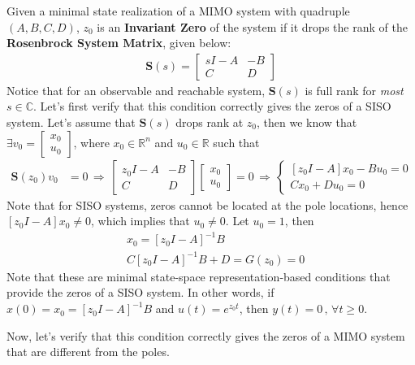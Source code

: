 \documentclass[twoside]{article}
\begin{document}
Given a minimal state realization of a MIMO system with quadruple $(A,B,C,D)$, $z_0$ is an \textbf{Invariant Zero} of the system if it drops the rank of the \textbf{Rosenbrock System Matrix}, given below:
%
\begin{align*}
\mathbf{S}(s) = \left[ \begin{array}{c|c} s I - A & -B \\ \hline C & D \end{array} \right]
\end{align*}
%
Notice that for an observable and reachable system, $\mathbf{S}(s)$ is full rank for \textit{most} $s \in \mathbb{C}$. 
Let's first verify that this condition correctly gives the zeros of a SISO system. Let's assume that 
$\mathbf{S}(s)$ drops rank at $z_0$, then we know that $\exists v_0 = \begin{bmatrix} x_0 \\ u_0 \end{bmatrix}$, where $x_0 \in \mathbb{R}^{n}$
and $u_0 \in \mathbb{R}$ such that 
%
\begin{align*}
\mathbf{S}(z_0) v_0 &= 0
\, \Rightarrow \,
\left[ \begin{array}{c|c} z_0 I - A & -B \\ \hline C & D \end{array} \right] \begin{bmatrix} x_0 \\ u_0 \end{bmatrix} = 0
\, \Rightarrow \,
 \begin{cases} \left[ z_0 I - A \right] x_0 - B u_0 = 0 \\ C x_0 + D u_0 = 0 \end{cases}
\end{align*}
%
Note that for SISO systems, zeros cannot be located at the pole locations, hence $ \left[ z_0 I - A \right] x_0 \neq 0$, which implies that $u_0 \neq 0$. Let $u_0 = 1$, then 
%
\begin{align*}
&x_0 =  \left[ z_0 I - A \right]^{-1} B  \\
&C \left[ z_0 I - A \right]^{-1} B  + D = G(z_0) =  0 
\end{align*}
%
Note that these are minimal state-space representation-based conditions that provide the zeros of a SISO system. In other words, if $x(0) = x_0 = \left[ z_0 I - A \right]^{-1} B$ and $u(t) = e^{z_0 t}$, then $y(t) = 0 \, , \, \forall t \geq 0$. 

Now, let's verify that this condition correctly gives the zeros of a MIMO system that are different from the poles. 
\end{document}
